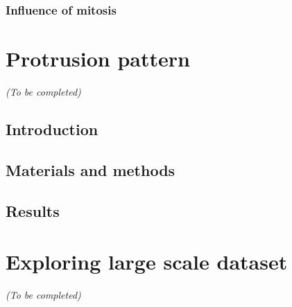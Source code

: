 \subsubsection{Influence of mitosis}

\section{Protrusion pattern}
\label{sec:protrusion}

\begin{center}
	\textit{(To be completed)}
\end{center}

\subsection{Introduction}
\label{subsec:introduction_protrusion}

\subsection{Materials and methods}
\label{subsec:materials_protrusion}

\subsection{Results}
\label{subsec:results_protrusion}

\section{Exploring large scale dataset}
\label{sec:exploration}

\begin{center}
	\textit{(To be completed)}
\end{center}



